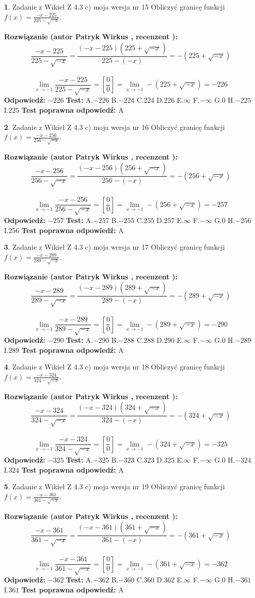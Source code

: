 \documentclass[12pt, a4paper]{article}
\theoremstyle{definition} %
\newtheorem{zad}{}
\newcommand{\zadStart}[1]{\begin{zad}#1\newline}
\newcommand{\zadStop}{\end{zad}}
\newcommand{\rozwStart}[2]{\noindent \textbf{Rozwiązanie (autor #1 , recenzent #2): }\newline}
\newcommand{\rozwStop}{\newline}
\newcommand{\odpStart}{\noindent \textbf{Odpowiedź:}\newline}
\newcommand{\odpStop}{\newline}
\newcommand{\testStart}{\noindent \textbf{Test:}\newline}
\newcommand{\testStop}{\newline}
\newcommand{\kluczStart}{\noindent \textbf{Test poprawna odpowiedź:}\newline}
\newcommand{\kluczStop}{\newline}
\begin{document}
\zadStart{Zadanie z Wikieł Z 4.3 c) moja wersja nr 15}
Obliczyć granicę funkcji $f(x)=\frac{-x-225}{225-\sqrt{-x}}$.
\zadStop
\rozwStart{Patryk Wirkus}{}
$$\frac{-x-225}{225-\sqrt{-x}}=\frac{(-x-225)(225+\sqrt{-x})}{225-(-x)}=-(225+\sqrt{-x})$$
\\
$$\lim\limits_{x\to-1}\frac{-x-225}{225-\sqrt{-x}}=[\frac{0}{0}]=\lim\limits_{x\to-1}-(225+\sqrt{-x}) =-226$$
\rozwStop
\odpStart
$-226$
\odpStop
\testStart
A.$-226$
B.$-224$
C.$224$
D.$226$
E.$\infty$
F.$-\infty$
G.$0$
H.$-225$
I.$225$
\testStop
\kluczStart
A
\kluczStop



\zadStart{Zadanie z Wikieł Z 4.3 c) moja wersja nr 16}
Obliczyć granicę funkcji $f(x)=\frac{-x-256}{256-\sqrt{-x}}$.
\zadStop
\rozwStart{Patryk Wirkus}{}
$$\frac{-x-256}{256-\sqrt{-x}}=\frac{(-x-256)(256+\sqrt{-x})}{256-(-x)}=-(256+\sqrt{-x})$$
\\
$$\lim\limits_{x\to-1}\frac{-x-256}{256-\sqrt{-x}}=[\frac{0}{0}]=\lim\limits_{x\to-1}-(256+\sqrt{-x}) =-257$$
\rozwStop
\odpStart
$-257$
\odpStop
\testStart
A.$-257$
B.$-255$
C.$255$
D.$257$
E.$\infty$
F.$-\infty$
G.$0$
H.$-256$
I.$256$
\testStop
\kluczStart
A
\kluczStop



\zadStart{Zadanie z Wikieł Z 4.3 c) moja wersja nr 17}
Obliczyć granicę funkcji $f(x)=\frac{-x-289}{289-\sqrt{-x}}$.
\zadStop
\rozwStart{Patryk Wirkus}{}
$$\frac{-x-289}{289-\sqrt{-x}}=\frac{(-x-289)(289+\sqrt{-x})}{289-(-x)}=-(289+\sqrt{-x})$$
\\
$$\lim\limits_{x\to-1}\frac{-x-289}{289-\sqrt{-x}}=[\frac{0}{0}]=\lim\limits_{x\to-1}-(289+\sqrt{-x}) =-290$$
\rozwStop
\odpStart
$-290$
\odpStop
\testStart
A.$-290$
B.$-288$
C.$288$
D.$290$
E.$\infty$
F.$-\infty$
G.$0$
H.$-289$
I.$289$
\testStop
\kluczStart
A
\kluczStop



\zadStart{Zadanie z Wikieł Z 4.3 c) moja wersja nr 18}
Obliczyć granicę funkcji $f(x)=\frac{-x-324}{324-\sqrt{-x}}$.
\zadStop
\rozwStart{Patryk Wirkus}{}
$$\frac{-x-324}{324-\sqrt{-x}}=\frac{(-x-324)(324+\sqrt{-x})}{324-(-x)}=-(324+\sqrt{-x})$$
\\
$$\lim\limits_{x\to-1}\frac{-x-324}{324-\sqrt{-x}}=[\frac{0}{0}]=\lim\limits_{x\to-1}-(324+\sqrt{-x}) =-325$$
\rozwStop
\odpStart
$-325$
\odpStop
\testStart
A.$-325$
B.$-323$
C.$323$
D.$325$
E.$\infty$
F.$-\infty$
G.$0$
H.$-324$
I.$324$
\testStop
\kluczStart
A
\kluczStop



\zadStart{Zadanie z Wikieł Z 4.3 c) moja wersja nr 19}
Obliczyć granicę funkcji $f(x)=\frac{-x-361}{361-\sqrt{-x}}$.
\zadStop
\rozwStart{Patryk Wirkus}{}
$$\frac{-x-361}{361-\sqrt{-x}}=\frac{(-x-361)(361+\sqrt{-x})}{361-(-x)}=-(361+\sqrt{-x})$$
\\
$$\lim\limits_{x\to-1}\frac{-x-361}{361-\sqrt{-x}}=[\frac{0}{0}]=\lim\limits_{x\to-1}-(361+\sqrt{-x}) =-362$$
\rozwStop
\odpStart
$-362$
\odpStop
\testStart
A.$-362$
B.$-360$
C.$360$
D.$362$
E.$\infty$
F.$-\infty$
G.$0$
H.$-361$
I.$361$
\testStop
\kluczStart
A
\kluczStop
\end{document}
